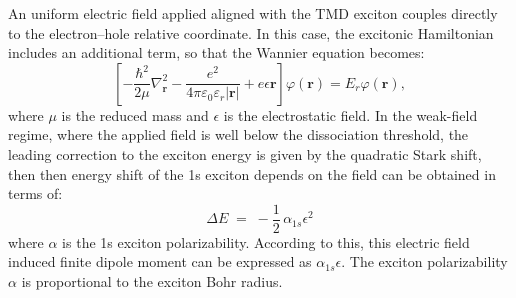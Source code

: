 An uniform electric field applied aligned with the TMD exciton couples directly to the electron--hole relative coordinate. 
In this case, the excitonic Hamiltonian includes an additional term, so that the Wannier equation becomes\cite{Pedersen2016-pv}:
\begin{equation}
\left[-\frac{\hbar^2}{2\mu}\nabla_{\mathbf r}^2 
- \frac{e^2}{4\pi\varepsilon_0\varepsilon_r |\mathbf r|}
+ e \epsilon \mathbf r \right] \varphi(\mathbf r) 
= E_r \varphi(\mathbf r),
\label{eq:wannier_field}
\end{equation}
where $\mu$ is the reduced mass and $\epsilon$ is the electrostatic field. 
In the weak-field regime, where the applied field is well below the dissociation threshold, the leading correction to the exciton energy is given by the quadratic Stark shift\cite{Lian2024-bh,Roch2018-lp}, then then energy shift of the 1s exciton depends on the field can be obtained in terms of\cite{Thureja2022-cv,Pedersen2016-pv}:
\begin{equation}
\Delta E \;=\; -\frac{1}{2}\,\alpha_{1s} \epsilon^2
\label{eq:stark_shift}
\end{equation}
where $\alpha$ is the 1s exciton polarizability.
According to this, this electric field induced finite dipole moment can be expressed as $\alpha_{1s} \epsilon$. 
The exciton polarizability $\alpha$ is proportional to the exciton Bohr radius. 


